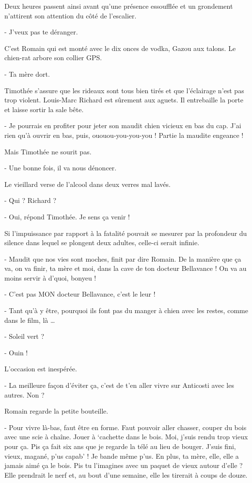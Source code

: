 Deux heures passent ainsi avant qu’une présence essoufflée et un grondement n’attirent son attention du côté de l’escalier.

- J’veux pas te déranger.

C’est Romain qui est monté avec le dix onces de vodka, Gazou aux talons. Le chien-rat arbore son collier GPS.

- Ta mère dort.

Timothée s’assure que les rideaux sont tous bien tirés et que l’éclairage n’est pas trop violent. Louis-Marc Richard est sûrement aux aguets. Il entrebaille la porte et laisse sortir la sale bête.

- Je pourrais en profiter pour jeter son maudit chien vicieux en bas du cap. J’ai rien qu’à ouvrir en bas, puis, ououou-you-you-you ! Partie la maudite engeance !

Mais Timothée ne sourit pas.

- Une bonne fois, il va nous dénoncer.

Le vieillard verse de l’alcool dans deux verres mal lavés.

- Qui ? Richard ?

- Oui, répond Timothée. Je sens ça venir !

Si l’impuissance par rapport à la fatalité pouvait se mesurer par la profondeur du silence dans lequel se plongent deux adultes, celle-ci serait infinie.

- Maudit que nos vies sont moches, finit par dire Romain. De la manière que ça va, on va finir, ta mère et moi, dans la cave de ton docteur Bellavance ! On va au moins servir à d’quoi, bonyeu !

- C’est pas MON docteur Bellavance, c’est le leur !

- Tant qu’à y être, pourquoi ils font pas du manger à chien avec les restes, comme dans le film, là …

- Soleil vert ?

- Ouin !

L’occasion est inespérée.

- La meilleure façon d’éviter ça, c’est de t’en aller vivre sur Anticosti avec les autres. Non ?

Romain regarde la petite bouteille.

- Pour vivre là-bas, faut être en forme. Faut pouvoir aller chasser, couper du bois avec une scie à chaîne. Jouer à ‘cachette dans le bois. Moi, j’suis rendu trop vieux pour ça. Pis ça fait six ans que je regarde la télé au lieu de bouger. J’suis fini, vieux, magané, p’us capab’ ! Je bande même p’us. En plus, ta mère, elle, elle a jamais aimé ça le bois. Pis tu l’imagines avec un paquet de vieux autour d’elle ? Elle prendrait le nerf et, au bout d’une semaine, elle les tirerait à coups de douze.

